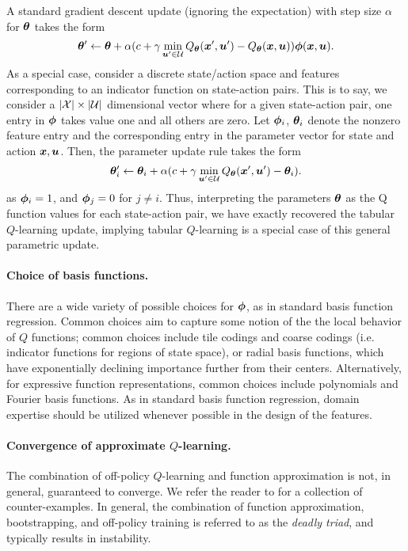 
A standard gradient descent update (ignoring the expectation) with step size $\alpha$ for $\bm{\theta}$ takes the form
\begin{equation}
    \bm{\theta}' \gets \bm{\theta} + \alpha (c + \gamma \min_{\bm{u}' \in \mathcal{U}} Q_{\bm{\theta}}(\bm{x}',\bm{u}') - Q_{\bm{\theta}}(\bm{x},\bm{u})) \bm{\phi}(\bm{x},\bm{u}).
\end{equation}
As a special case, consider a discrete state/action space and features corresponding to an indicator function on state-action pairs. This is to say, we consider a $|\mathcal{X}|\times|\mathcal{U}|$ dimensional vector where for a given state-action pair, one entry in $\bm{\phi}$ takes value one and all others are zero. Let $\bm{\phi}_i$, $\bm{\theta}_i$ denote the nonzero feature entry and the corresponding entry in the parameter vector for state and action $\bm{x}, \bm{u}$. Then, the parameter update rule takes the form
\begin{equation}
    \bm{\theta}_i' \gets \bm{\theta}_i + \alpha (c + \gamma \min_{\bm{u}' \in \mathcal{U}} Q_{\bm{\theta}}(\bm{x}',\bm{u}') - \bm{\theta}_i).
\end{equation}
as $\bm{\phi}_i = 1$, and $\bm{\phi}_{j} = 0$ for $j \neq i$. Thus, interpreting the parameters $\bm{\theta}$ as the Q function values for each state-action pair, we have exactly recovered the tabular $Q$-learning update, implying tabular $Q$-learning is a special case of this general parametric update. 

\paragraph{Choice of basis functions.} There are a wide variety of possible choices for $\bm{\phi}$, as in standard basis function regression. Common choices aim to capture some notion of the the local behavior of $Q$ functions; common choices include tile codings and coarse codings (i.e. indicator functions for regions of state space), or radial basis functions, which have exponentially declining importance further from their centers. Alternatively, for expressive function representations, common choices include polynomials and Fourier basis functions. As in standard basis function regression, domain expertise should be utilized whenever possible in the design of the features. 

\paragraph{Convergence of approximate $Q$-learning.} The combination of off-policy $Q$-learning and function approximation is not, in general, guaranteed to converge. We refer the reader to \cite{sutton2018reinforcement} for a collection of counter-examples. In general, the combination of function approximation, bootstrapping, and off-policy training is referred to as the \textit{deadly triad}, and typically results in instability. 

